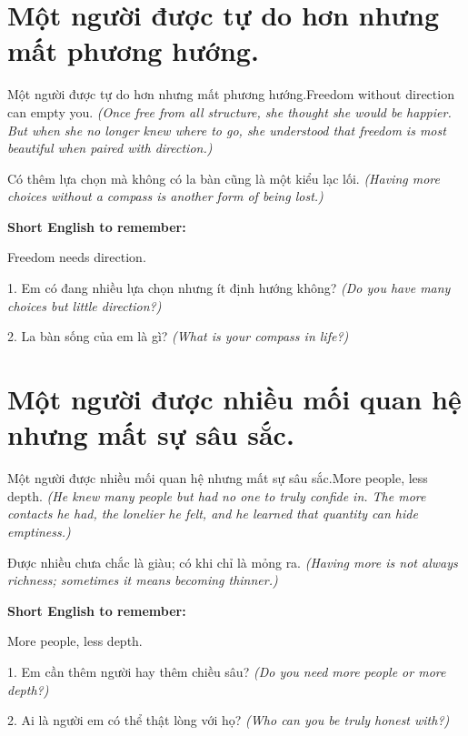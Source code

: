 \section{Một người được tự do hơn nhưng mất phương hướng.}
\begin{truyen}{Một người được tự do hơn nhưng mất phương hướng.}{Freedom without direction can empty you.}
\textit{(Once free from all structure, she thought she would be happier. But when she no longer knew where to go, she understood that freedom is most beautiful when paired with direction.)}
\end{truyen}
\begin{baihoc}
Có thêm lựa chọn mà không có la bàn cũng là một kiểu lạc lối.
\textit{(Having more choices without a compass is another form of being lost.)}
\end{baihoc}
\begin{ghinhoanh}\textbf{Short English to remember:}

Freedom needs direction.
\end{ghinhoanh}
\begin{tuhocnhanh}
1. Em có đang nhiều lựa chọn nhưng ít định hướng không? \textit{(Do you have many choices but little direction?)}

2. La bàn sống của em là gì? \textit{(What is your compass in life?)}
\end{tuhocnhanh}
\ngancach

\section{Một người được nhiều mối quan hệ nhưng mất sự sâu sắc.}
\begin{truyen}{Một người được nhiều mối quan hệ nhưng mất sự sâu sắc.}{More people, less depth.}
\textit{(He knew many people but had no one to truly confide in. The more contacts he had, the lonelier he felt, and he learned that quantity can hide emptiness.)}
\end{truyen}
\begin{baihoc}
Được nhiều chưa chắc là giàu; có khi chỉ là mỏng ra.
\textit{(Having more is not always richness; sometimes it means becoming thinner.)}
\end{baihoc}
\begin{ghinhoanh}\textbf{Short English to remember:}

More people, less depth.
\end{ghinhoanh}
\begin{tuhocnhanh}
1. Em cần thêm người hay thêm chiều sâu? \textit{(Do you need more people or more depth?)}

2. Ai là người em có thể thật lòng với họ? \textit{(Who can you be truly honest with?)}
\end{tuhocnhanh}
\ngancach